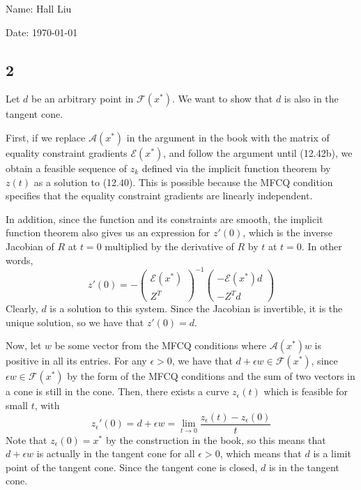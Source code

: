 \documentclass{article}
\newcommand{\ep}{\epsilon}
\newcommand{\openm}{\begin{pmatrix}}
\newcommand{\closem}{\end{pmatrix}}
\begin{document}
Name: Hall Liu

Date: \today 
\vspace{1.5cm}
\subsection*{2}
Let $d$ be an arbitrary point in $\mathscr{F}(x^*)$. We want to show that $d$ is also in the tangent cone.

First, if we replace $\mathscr{A}(x^*)$ in the argument in the book with the matrix of equality constraint gradients $\mathscr{E}(x^*)$, and follow the argument until (12.42b), we obtain a feasible sequence of $z_k$ defined via the implicit function theorem by $z(t)$ as a solution to (12.40). This is possible because the MFCQ condition specifies that the equality constraint gradients are linearly independent. 

In addition, since the function and its constraints are smooth, the implicit function theorem also gives us an expression for $z'(0)$, which is the inverse Jacobian of $R$ at $t=0$ multiplied by the derivative of $R$ by $t$ at $t=0$. In other words, 
\[z'(0)=-\openm \mathscr{E}(x^*)\\Z^T\closem^{-1}\openm-\mathscr{E}(x^*)d\\-Z^Td\closem\]
Clearly, $d$ is a solution to this system. Since the Jacobian is invertible, it is the unique solution, so we have that $z'(0)=d$.

Now, let $w$ be some vector from the MFCQ conditions where $\mathscr{A}(x^*)w$ is positive in all its entries. For any $\ep>0$, we have that $d+\ep w\in\mathscr{F}(x^*)$, since $\ep w\in\mathscr{F}(x^*)$ by the form of the MFCQ conditions and the sum of two vectors in a cone is still in the cone. Then, there exists a curve $z_\ep(t)$ which is feasible for small $t$, with 
\[z_\ep'(0)=d+\ep w=\lim_{t\to 0}\frac{z_\ep(t)-z_\ep(0)}{t}\]
Note that $z_\ep(0)=x^*$ by the construction in the book, so this means that $d+\ep w$ is actually in the tangent cone for all $\ep>0$, which means that $d$ is a limit point of the tangent cone. Since the tangent cone is closed, $d$ is in the tangent cone.
\end{document}
